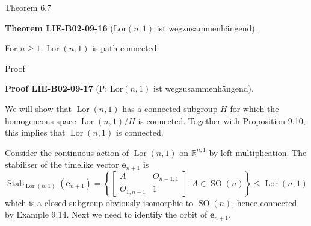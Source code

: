\documentclass[10pt, letterpaper]{article}
\newcommand{\CustomHeading}[3]{%
  \par\medskip\noindent%
  \textbf{#1 #2} \textnormal{(#3)}.\enskip%
}
\newenvironment{THEO}[2]{\begin{unitbox}\CustomHeading{Theorem}{#1}{#2}}{\end{unitbox}}
\newenvironment{PROOF}[2]{\begin{unitbox}\CustomHeading{Proof}{#1}{#2}}{\end{unitbox}}
\begin{document}
Theorem 6.7


\begin{THEO}{LIE-B02-09-16}{$\mathrm{Lor}(n,1)$ ist wegzusammenhängend}
For $n \geqslant 1, \operatorname{Lor}(n, 1)$ is path connected.
\end{THEO}



Proof


\begin{PROOF}{LIE-B02-09-17}{P: $\mathrm{Lor}(n,1)$ ist wegzusammenhängend}
We will show that $\operatorname{Lor}(n, 1)$ has a connected subgroup $H$ for which the homogeneous space $\operatorname{Lor}(n, 1) / H$ is connected. Together with Proposition 9.10, this implies that $\operatorname{Lor}(n, 1)$ is connected.

Consider the continuous action of $\operatorname{Lor}(n, 1)$ on $\mathbb{R}^{n, 1}$ by left multiplication. The stabiliser of the timelike vector $\mathbf{e}_{n+1}$ is
$$
\operatorname{Stab}_{\operatorname{Lor}(n, 1)}\left(\mathbf{e}_{n+1}\right)=\left\{\left[\begin{array}{cc}
A & O_{n-1,1} \\
O_{1, n-1} & 1
\end{array}\right]: A \in \operatorname{SO}(n)\right\} \leqslant \operatorname{Lor}(n, 1)
$$
which is a closed subgroup obviously isomorphic to $\operatorname{SO}(n)$, hence connected by Example 9.14. Next we need to identify the orbit of $\mathbf{e}_{n+1}$.


\end{PROOF}
\end{document}
